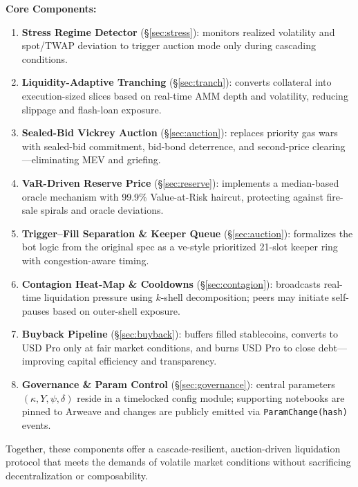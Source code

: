 \documentclass[11pt]{article}
\begin{document}
\vspace{1em}
\noindent
\textbf{Core Components:}
\begin{enumerate}[label=\textbf{\arabic*.},wide, labelindent=0pt]
  \item \textbf{Stress Regime Detector} (§\ref{sec:stress}): monitors realized volatility and spot/TWAP deviation to trigger auction mode only during cascading conditions.

  \item \textbf{Liquidity-Adaptive Tranching} (§\ref{sec:tranch}): converts collateral into execution-sized slices based on real-time AMM depth and volatility, reducing slippage and flash-loan exposure.

  \item \textbf{Sealed-Bid Vickrey Auction} (§\ref{sec:auction}): replaces priority gas wars with sealed-bid commitment, bid-bond deterrence, and second-price clearing—eliminating MEV and griefing.

  \item \textbf{VaR-Driven Reserve Price} (§\ref{sec:reserve}): implements a median-based oracle mechanism with 99.9\% Value-at-Risk haircut, protecting against fire-sale spirals and oracle deviations.

  \item \textbf{Trigger–Fill Separation \& Keeper Queue} (§\ref{sec:auction}): formalizes the bot logic from the original spec as a ve-style prioritized 21-slot keeper ring with congestion-aware timing.

  \item \textbf{Contagion Heat-Map \& Cooldowns} (§\ref{sec:contagion}): broadcasts real-time liquidation pressure using $k$-shell decomposition; peers may initiate self-pauses based on outer-shell exposure.

  \item \textbf{Buyback Pipeline} (§\ref{sec:buyback}): buffers filled stablecoins, converts to USD Pro only at fair market conditions, and burns USD Pro to close debt—improving capital efficiency and transparency.
  \item \textbf{Governance \& Param Control} (§\ref{sec:governance}): central parameters \((\kappa, Y, \psi, \delta)\) reside in a timelocked config module; supporting notebooks are pinned to Arweave and changes are publicly emitted via \texttt{ParamChange(hash)} events.

\end{enumerate}

\noindent
Together, these components offer a cascade-resilient, auction-driven liquidation protocol that meets the demands of volatile market conditions without sacrificing decentralization or composability.
\end{document}

